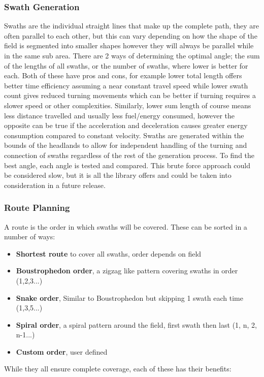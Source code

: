 \documentclass[final]{cmpreport_02}
\begin{document}
\subsubsection{Swath Generation}
Swaths are the individual straight lines that make up the complete path,
they are often parallel to each other, but this can vary depending on how the shape of the field is segmented into smaller shapes however they will always be parallel while in the same sub area.
There are 2 ways of determining the optimal angle; the sum of the lengths of all swaths, or the number of swaths, where lower is better for each.
Both of these have pros and cons, for example lower total length offers better time efficiency assuming a near constant travel speed while lower swath count gives reduced turning movements which can be better if turning requires a slower speed or other complexities.
Similarly, lower sum length of course means less distance travelled and usually less fuel/energy consumed, however the opposite can be true if the acceleration and deceleration causes greater energy consumption compared to constant velocity.
Swaths are generated within the bounds of the headlands to allow for independent handling of the turning and connection of swaths regardless of the rest of the generation process.
To find the best angle, each angle is tested and compared. This brute force approach could be considered slow, but it is all the library offers and could be taken into consideration in a future release.

\subsubsection{Route Planning}
A route is the order in which swaths will be covered.
These can be sorted in a number of ways:

\begin{itemize}
	\item{\textbf{Shortest route} to cover all swaths, order depends on field}
	\item{\textbf{Boustrophedon order}, a zigzag like pattern covering swaths in order (1,2,3...)}
	\item{\textbf{Snake order}, Similar to Boustrophedon but skipping 1 swath each time (1,3,5...)}
	\item{\textbf{Spiral order}, a spiral pattern around the field, first swath then last (1, n, 2, n-1...)}
	\item{\textbf{Custom order}, user defined}
\end{itemize}
While they all ensure complete coverage, each of these has their benefits:
\end{document}
